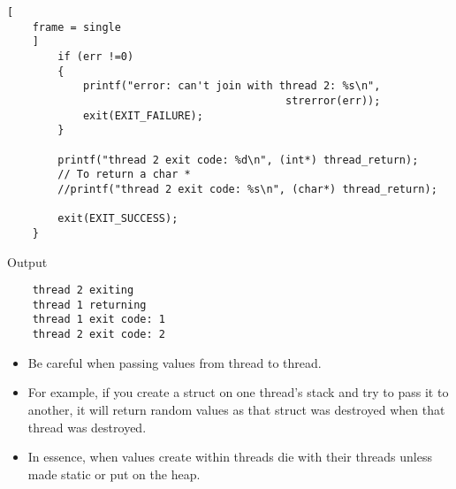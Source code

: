 \documentclass{article}
\begin{document}
\begin{lstlisting}[
    frame = single
    ]
        if (err !=0)
        {
            printf("error: can't join with thread 2: %s\n", 
                                            strerror(err));
            exit(EXIT_FAILURE);
        }

        printf("thread 2 exit code: %d\n", (int*) thread_return);
        // To return a char *
        //printf("thread 2 exit code: %s\n", (char*) thread_return);

        exit(EXIT_SUCCESS);
    }
\end{lstlisting}
{\Large{Output}}
\begin{verbatim}
    thread 2 exiting
    thread 1 returning
    thread 1 exit code: 1
    thread 2 exit code: 2
\end{verbatim}

\begin{itemize}
    \item Be careful when passing values from thread to thread.
    \item For example, if you create a struct on one thread's stack and try to pass it to another,
    it will return random values as that struct was destroyed when that thread was destroyed.
    \item In essence, when values create within threads die with their threads unless made static or put on the heap.
\end{itemize}
\end{document}
